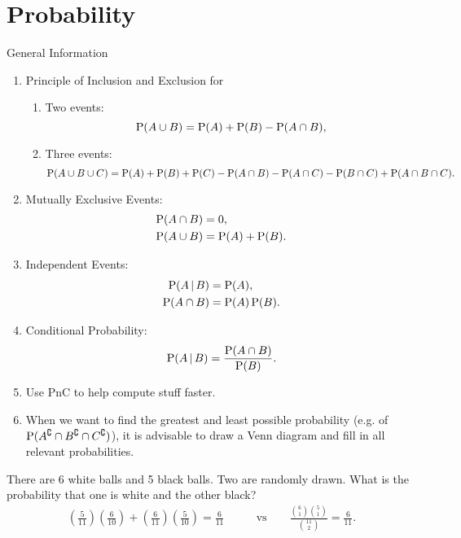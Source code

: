 \documentclass[oneside]{book}
\begin{document}
\chapter{Probability}
\begin{stbox}{General Information}
  \begin{enumerate}
    \item Principle of Inclusion and Exclusion for
    \begin{enumerate}
      \item Two events:
      \[\operatorname{P}(A \cup B)=\operatorname{P}(A)+\operatorname{P}(B)-\operatorname{P}(A \cap B),\]
      \item Three events:
      \[\operatorname{P}(A \cup B \cup C)=\operatorname{P}(A)+\operatorname{P}(B)+\operatorname{P}(C)-\operatorname{P}(A\cap B)-\operatorname{P}(A \cap C)-\operatorname{P}(B \cap C)+\operatorname{P}(A \cap B \cap C).\]
    \end{enumerate}
    \item Mutually Exclusive Events:
    \begin{align*}
      \operatorname{P}(A \cap B)&=0,\\
      \operatorname{P}(A \cup B)&=\operatorname{P}(A)+\operatorname{P}(B).
    \end{align*}
    \item Independent Events:
    \begin{align*}
      \operatorname{P}(A \,\vert\, B)&=\operatorname{P}(A),\\
      \operatorname{P}(A \cap B)&=\operatorname{P}(A)\operatorname{P}(B).
    \end{align*}
    \item Conditional Probability:
    \[\operatorname{P}(A \,\vert\, B)=\frac{\operatorname{P}(A \cap B)}{\operatorname{P}(B)}.\]
    \item Use PnC to help compute stuff faster.
    \item When we want to find the greatest and least possible probability (e.g. of \(\operatorname{P}(A^\complement\cap B^\complement\cap C^\complement)\)), it is advisable to draw a Venn diagram and fill in all relevant probabilities. 
  \end{enumerate}
\end{stbox}
\begin{example}{}{}
  There are 6 white balls and 5 black balls. Two are randomly drawn. What is the probability that one is white and the other black?
  \begin{align*}
    \left(\frac{5}{11}\right)\left(\frac{6}{10}\right)+\left(\frac{6}{11}\right)\left(\frac{5}{10}\right)=\frac{6}{11} \qquad&\text{vs}\qquad \frac{\binom{6}{1}\binom{5}{1}}{\binom{11}{2}}=\frac{6}{11}.
  \end{align*}
\end{example}
\end{document}
